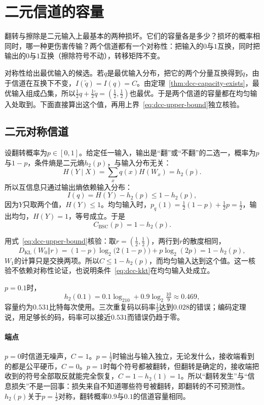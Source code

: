 \section{二元信道的容量}
\label{sec:dcc-binary}

翻转与擦除是二元输入上最基本的两种损坏。它们的容量各是多少？损坏的概率相同时，哪一种更伤害传输？两个信道都有一个对称性：把输入的$0$与$1$互换，同时把输出的$0$与$1$互换（擦除符号不动），转移矩阵不变。

对称性给出最优输入的候选。若$q$是最优输入分布，把它的两个分量互换得到$\tilde{q}$，由于信道在互换下不变，$I(\tilde{q})=I(q)=C$。由定理~\ref{thm:dcc-capacity-exists}，最优输入组成凸集，所以$\tfrac12q+\tfrac12\tilde{q}=(\tfrac12,\tfrac12)$也最优。于是两个信道的容量都在均匀输入处取到。下面直接算出这个值，再用上界~\eqref{eq:dcc-upper-bound}独立核验。

\subsection{二元对称信道}
\label{sec:dcc-bsc}

设翻转概率为$p\in[0,1]$。给定任一输入，输出是“翻”或“不翻”的二选一，概率为$p$与$1-p$，条件熵是二元熵$h_2(p)$，与输入分布无关：
\[
 H(Y\mid X)=\sum_xq(x)H(W_x)=h_2(p) .
\]
所以互信息只通过输出熵依赖输入分布：
\[
 I(q)=H(Y)-h_2(p)\leq1-h_2(p) ,
\]
因为$Y$只取两个值，$H(Y)\leq1$。均匀输入时，$p_q(1)=\tfrac12(1-p)+\tfrac12p=\tfrac12$，输出均匀，$H(Y)=1$，等号成立。于是
\begin{equation}
 C_{\mathrm{BSC}}(p)=1-h_2(p) .
 \label{eq:dcc-bsc-capacity}
\end{equation}

用式~\eqref{eq:dcc-upper-bound}核验：取$r=(\tfrac12,\tfrac12)$，两行到$r$的散度相同，
\[
 D_{\mathrm{KL}}(W_0\Vert r)=(1-p)\log_2\bigl(2(1-p)\bigr)+p\log_2(2p)=1-h_2(p) ,
\]
$W_1$的计算只是交换两项。所以$C\leq1-h_2(p)$，而均匀输入达到这个值。这一核验不依赖对称性论证，也说明条件~\eqref{eq:dcc-kkt}在均匀输入处成立。

$p=0.1$时，
\[
 h_2(0.1)=0.1\log_210+0.9\log_2\tfrac{10}{9}\approx0.469 ,
\]
容量约为$0.531$比特每次使用。三次重复码以码率$\tfrac13$达到$0.028$的错误；编码定理说，用足够长的码，码率可以接近$0.531$而错误仍趋于零。

\paragraph{端点}
$p=0$时信道无噪声，$C=1$。$p=\tfrac12$时输出与输入独立，无论发什么，接收端看到的都是公平硬币，$C=0$。$p=1$时每个符号都被翻转，但翻转是确定的，接收端把收到的符号全部取反就能完全恢复，$C=1-h_2(1)=1$。所以“翻转发生”与“信息损失”不是一回事：损失来自不知道哪些符号被翻转，即翻转的不可预测性。$h_2(p)$关于$p=\tfrac12$对称，翻转概率$0.9$与$0.1$的信道容量相同。

